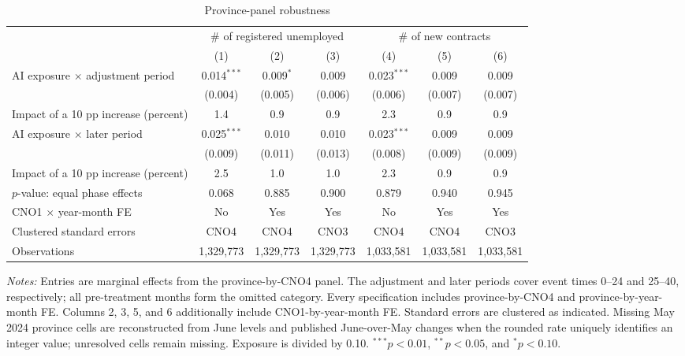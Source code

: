 \begin{table}[!htbp]
\centering
\caption{Province-panel robustness}
\label{tab:v1_province}
\begin{threeparttable}
\scriptsize
\setlength{\tabcolsep}{3.5pt}
\begin{tabular}{lcccccc}
\toprule
& \multicolumn{3}{c}{\# of registered unemployed} & \multicolumn{3}{c}{\# of new contracts} \\
\cmidrule(lr){2-4}\cmidrule(lr){5-7}
& (1) & (2) & (3) & (4) & (5) & (6) \\
\midrule
AI exposure $\times$ adjustment period & 0.014$^{***}$ & 0.009$^{*}$ & 0.009 & 0.023$^{***}$ & 0.009 & 0.009 \\
 & (0.004) & (0.005) & (0.006) & (0.006) & (0.007) & (0.007) \\
Impact of a 10 pp increase (percent) & 1.4 & 0.9 & 0.9 & 2.3 & 0.9 & 0.9 \\
\addlinespace
AI exposure $\times$ later period & 0.025$^{***}$ & 0.010 & 0.010 & 0.023$^{***}$ & 0.009 & 0.009 \\
 & (0.009) & (0.011) & (0.013) & (0.008) & (0.009) & (0.009) \\
Impact of a 10 pp increase (percent) & 2.5 & 1.0 & 1.0 & 2.3 & 0.9 & 0.9 \\
$p$-value: equal phase effects & 0.068 & 0.885 & 0.900 & 0.879 & 0.940 & 0.945 \\
\midrule
CNO1 $\times$ year-month FE & No & Yes & Yes & No & Yes & Yes \\
Clustered standard errors & CNO4 & CNO4 & CNO3 & CNO4 & CNO4 & CNO3 \\
Observations & 1,329,773 & 1,329,773 & 1,329,773 & 1,033,581 & 1,033,581 & 1,033,581 \\
\bottomrule
\end{tabular}
\begin{tablenotes}[flushleft]
\footnotesize
\item \emph{Notes:} Entries are marginal effects from the province-by-CNO4 panel. The adjustment and later periods cover event times 0--24 and 25--40, respectively; all pre-treatment months form the omitted category. Every specification includes province-by-CNO4 and province-by-year-month FE. Columns 2, 3, 5, and 6 additionally include CNO1-by-year-month FE. Standard errors are clustered as indicated. Missing May 2024 province cells are reconstructed from June levels and published June-over-May changes when the rounded rate uniquely identifies an integer value; unresolved cells remain missing. Exposure is divided by 0.10. $^{***}p<0.01$, $^{**}p<0.05$, and $^{*}p<0.10$.
\end{tablenotes}
\end{threeparttable}
\end{table}

